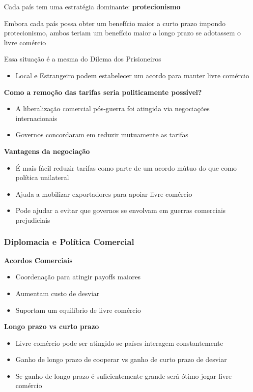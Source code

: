 \documentclass[a4paper,12pt]{article}[abntex2]
\begin{document}
Cada país tem uma estratégia dominante: \textbf{protecionismo}

Embora cada país possa obter um benefício maior a curto prazo impondo protecionismo, ambos teriam um benefício maior a longo prazo se adotassem o livre comércio

Essa situação é a mesma do Dilema dos Prisioneiros
\begin{itemize}
  \item Local e Estrangeiro podem estabelecer um acordo para manter livre comércio
\end{itemize}

\textbf{Como a remoção das tarifas seria politicamente possível?}
\begin{itemize}
  \item A liberalização comercial pós-guerra foi atingida via negociações internacionais
  \item Governos concordaram em reduzir mutuamente as tarifas
\end{itemize}

\textbf{Vantagens da negociação}
\begin{itemize}
  \item É mais fácil reduzir tarifas como parte de um acordo mútuo do que como política unilateral
  \item Ajuda a mobilizar exportadores para apoiar livre comércio
  \item Pode ajudar a evitar que governos se envolvam em guerras comerciais prejudiciais
\end{itemize}

\subsubsection{\textbf{Diplomacia e Política Comercial}}
\textbf{Acordos Comerciais}
\begin{itemize}
  \item Coordenação para atingir payoffs maiores
  \item Aumentam custo de desviar
  \item Suportam um equilíbrio de livre comércio
\end{itemize}

\textbf{Longo prazo vs curto prazo}
\begin{itemize}
  \item Livre comércio pode ser atingido se países interagem constantemente
  \item Ganho de longo prazo de cooperar vs ganho de curto prazo de desviar
  \item Se ganho de longo prazo é suficientemente grande será ótimo jogar livre comércio
\end{itemize}
\end{document}
